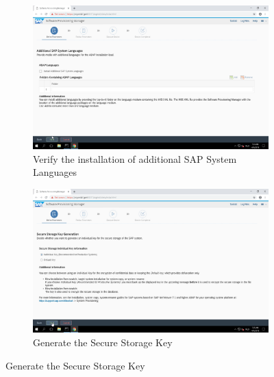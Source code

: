 \begin{figure}[!htb]\ContinuedFloat
    \begin{subfigure}{0.5\textwidth}
        \captionsetup{width=0.8\linewidth}
        \includegraphics[width=0.9\linewidth]{img/Methodologie/SAP04.png}
        \centering
        \caption{Verify the installation of additional SAP System Languages}
    \end{subfigure}
    \begin{subfigure}{0.5\textwidth}
        \captionsetup{width=0.8\linewidth}
        \includegraphics[width=0.9\linewidth]{img/Methodologie/SAP03.png} 
        \centering
        \caption{Generate the Secure Storage Key}
    \end{subfigure}
\end{figure}
